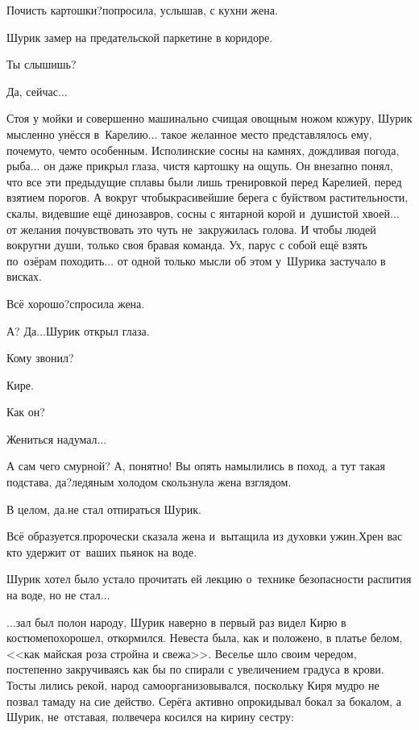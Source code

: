 {\diagdash Почисть картошки?\mdash попросила, услышав, с кухни жена.

Шурик замер на предательской паркетине в коридоре.

\diagdash Ты слышишь?

\diagdash Да, сейчас$\ldots$

Стоя у мойки и совершенно машинально счищая овощным ножом кожуру, Шурик мысленно унёсся в~Карелию$\ldots$ такое желанное место представлялось ему, почему\sdash то, чем\sdash то особенным. Исполинские сосны на камнях, дождливая погода, рыба$\ldots$ он даже прикрыл глаза, чистя картошку на ощупь. Он внезапно понял, что все эти предыдущие сплавы были лишь тренировкой перед Карелией, перед взятием порогов. А вокруг чтобы\mdash красивейшие берега с буйством растительности, скалы, видевшие ещё динозавров, сосны с янтарной корой и~душистой хвоей$\ldots$ от желания почувствовать это чуть не~закружилась голова. И чтобы людей вокруг\mdash ни души, только своя бравая команда. Ух, парус с собой ещё взять по~озёрам походить$\ldots$ от одной только мысли об этом у~Шурика застучало в висках.

\diagdash Всё хорошо?\mdash спросила жена.

\diagdash А? Да$\ldots$\mdash Шурик открыл глаза.

\diagdash Кому звонил?

\diagdash Кире.

\diagdash Как он? 

\diagdash Жениться надумал$\ldots$ 

\diagdash А сам чего смурной? А, понятно! Вы опять намылились в поход, а тут такая подстава, да?\mdash ледяным холодом скользнула жена взглядом.

\diagdash В целом, да.\mdash не стал отпираться Шурик.

\diagdash Всё образуется.\mdash пророчески сказала жена и~вытащила из духовки ужин.\mdash Хрен вас кто удержит от~ваших пьянок на воде.

Шурик хотел было устало прочитать ей лекцию о~технике безопасности распития на воде, но не стал$\ldots$ 

\vspace{0.5cm}

$\ldots$зал был полон народу, Шурик наверно в первый раз видел Кирю в костюме\mdash похорошел, откормился. Невеста была, как и положено, в платье белом, <<как майская роза стройна и свежа>>. Веселье шло своим чередом, постепенно закручиваясь как бы по спирали с увеличением градуса в крови. Тосты лились рекой, народ самоорганизовывался, поскольку Киря мудро не позвал тамаду на сие действо. Серёга активно опрокидывал бокал за бокалом, а Шурик, не~отставая, полвечера косился на кирину сестру:

}
